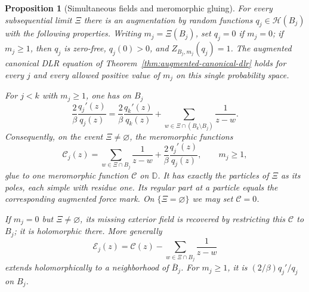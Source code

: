 \documentclass[11pt,a4paper]{article}
\numberwithin{equation}{section}
\newtheorem{proposition}[theorem]{Proposition}
\theoremstyle{definition}
\theoremstyle{remark}
\newcommand{\D}{\mathbb D}
\begin{document}
\begin{proposition}[Simultaneous fields and meromorphic gluing]
\label{prop:meromorphic-field-gluing}
For every subsequential limit $\Xi$ there is an augmentation by random
functions $q_j\in\mathcal H(B_j)$ with the following properties.
Writing $m_j=\Xi(B_j)$, set $q_j=0$ if $m_j=0$; if $m_j\ge1$, then
$q_j$ is zero-free, $q_j(0)>0$, and $Z_{B_j,m_j}(q_j)=1$.
The augmented canonical DLR equation of
Theorem~\ref{thm:augmented-canonical-dlr} holds for every $j$ and every
allowed positive value of $m_j$ on this single probability space.

For $j<k$ with $m_j\ge1$, one has on $B_j$
\begin{equation}\label{eq:nested-exterior-field-compatibility}
 \frac2\beta\frac{q_j'(z)}{q_j(z)}
   =\frac2\beta\frac{q_k'(z)}{q_k(z)}
        +\sum_{w\in\Xi\cap(B_k\setminus B_j)}\frac1{z-w}.
\end{equation}
Consequently, on the event $\Xi\ne\varnothing$, the meromorphic
functions
\begin{equation}\label{eq:local-total-meromorphic-field}
 \mathcal C_j(z)=\sum_{w\in\Xi\cap B_j}\frac1{z-w}
                      +\frac2\beta\frac{q_j'(z)}{q_j(z)},
                    \qquad m_j\ge1,
\end{equation}
glue to one meromorphic function $\mathcal C$ on $\D$. It has exactly
the particles of $\Xi$ as its poles, each simple with residue one.
Its regular part at a particle equals the corresponding augmented
force mark. On $\{\Xi=\varnothing\}$ we may set $\mathcal C=0$.

If $m_j=0$ but $\Xi\ne\varnothing$, its missing exterior field is
recovered by restricting this $\mathcal C$ to $B_j$; it is holomorphic
there. More generally
\begin{equation}\label{eq:glued-augmented-exterior-field}
 \mathcal E_j(z)=\mathcal C(z)
              -\sum_{w\in\Xi\cap B_j}\frac1{z-w}
\end{equation}
extends holomorphically to a neighborhood of $\overline B_j$.
For $m_j\ge1$, it is $(2/\beta)q_j'/q_j$ on $B_j$.
\end{proposition}
\end{document}
